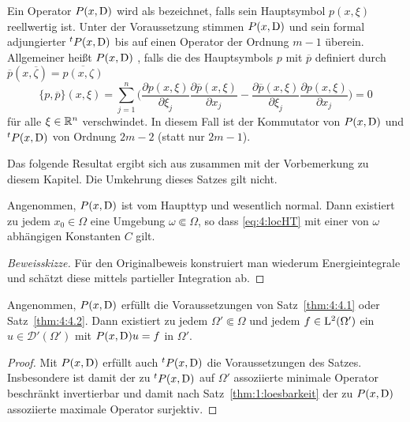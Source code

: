 Ein Operator $P(x,\mathrm D)$ wird als   bezeichnet, falls sein Hauptsymbol $p(x,\xi)$ reellwertig ist. Unter der Voraussetzung stimmen $P(x,\mathrm D)$ und sein formal adjungierter ${}^tP(x,\mathrm D)$ bis auf einen Operator der Ordnung $m-1$ überein. Allgemeiner heißt $P(x,\mathrm D)$ , falls die   des Hauptsymbols $p$ mit $\overline p$ definiert durch $\overline p(x, \overline\zeta) = \overline{p(x,\zeta)}$
\begin{equation}
    \{ p,\overline p\} (x,\xi) = \sum_{j=1}^n \bigg(\frac{\partial p(x,\xi)}{\partial \xi_j} \frac{\partial \overline p (x,\xi)}{\partial x_j} - \frac{\partial \overline p(x,\xi)}{\partial \xi_j}\frac{\partial  p(x,\xi)}{\partial x_j} \bigg)    = 0 
\end{equation}
für alle $\xi\in\mathbb R^n$ verschwindet. In diesem Fall ist der Kommutator von $P(x,\mathrm D)$ und ${}^tP(x,\mathrm D)$ von Ordnung $2m-2$ (statt nur $2m-1$).

Das folgende Resultat ergibt sich aus \cite[Theorem~4.1]{Hormander:1955} zusammen mit der Vorbemerkung zu diesem Kapitel. Die Umkehrung dieses Satzes gilt nicht.

\begin{thm}\label{thm:4:4.2}
Angenommen, $P(x,\mathrm D)$ ist vom Haupttyp und wesentlich normal. Dann existiert zu jedem $x_0\in\Omega$ eine Umgebung $\omega\Subset\Omega$, so dass
\eqref{eq:4:locHT} mit einer von $\omega$ abhängigen Konstanten $C$ gilt.
\end{thm}
\begin{proof}[Beweisskizze]
Für den Originalbeweis konstruiert man wiederum Energieintegrale und schätzt diese mittels partieller Integration ab.
\end{proof}

\begin{cor}
Angenommen, $P(x,\mathrm D)$ erfüllt die Voraussetzungen von Satz~\ref{thm:4:4.1} oder Satz~\ref{thm:4:4.2}. Dann existiert zu jedem $\Omega'\Subset\Omega$ und jedem
$f\in\mathrm L^2(\Omega')$ ein $u\in\mathscr D'(\Omega')$ mit $P(x,\mathrm D)u=f$ in $\Omega'$.
\end{cor}
\begin{proof}
Mit $P(x,\mathrm D)$ erfüllt auch ${}^tP(x,\mathrm D)$ die Voraussetzungen des Satzes. Insbesondere ist damit der zu ${}^tP(x,\mathrm D)$ auf $\Omega'$ assoziierte minimale Operator beschränkt invertierbar und damit nach Satz~\ref{thm:1:loesbarkeit} der zu $P(x,\mathrm D)$ assoziierte maximale Operator surjektiv.
\end{proof}

